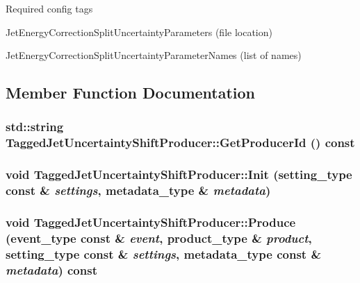 Required config tags
\begin{DoxyItemize}
\item JetEnergyCorrectionSplitUncertaintyParameters (file location)
\item JetEnergyCorrectionSplitUncertaintyParameterNames (list of names) 
\end{DoxyItemize}

\subsection{Member Function Documentation}
\hypertarget{classTaggedJetUncertaintyShiftProducer_a8c04af8f7018d1e03f14f4bf89b90a0d}{
\subsubsection[{GetProducerId}]{\setlength{\rightskip}{0pt plus 5cm}std::string TaggedJetUncertaintyShiftProducer::GetProducerId () const}}
\label{classTaggedJetUncertaintyShiftProducer_a8c04af8f7018d1e03f14f4bf89b90a0d}
\hypertarget{classTaggedJetUncertaintyShiftProducer_ac0810ddb6c73d8e1ff9fc55a801b6046}{
\subsubsection[{Init}]{\setlength{\rightskip}{0pt plus 5cm}void TaggedJetUncertaintyShiftProducer::Init (setting\_\-type const \& {\em settings}, \/  metadata\_\-type \& {\em metadata})}}
\label{classTaggedJetUncertaintyShiftProducer_ac0810ddb6c73d8e1ff9fc55a801b6046}
\hypertarget{classTaggedJetUncertaintyShiftProducer_a45171dc99c8a5f63ecdb9531831c473a}{
\subsubsection[{Produce}]{\setlength{\rightskip}{0pt plus 5cm}void TaggedJetUncertaintyShiftProducer::Produce (event\_\-type const \& {\em event}, \/  product\_\-type \& {\em product}, \/  setting\_\-type const \& {\em settings}, \/  metadata\_\-type const \& {\em metadata}) const}}
\label{classTaggedJetUncertaintyShiftProducer_a45171dc99c8a5f63ecdb9531831c473a}


